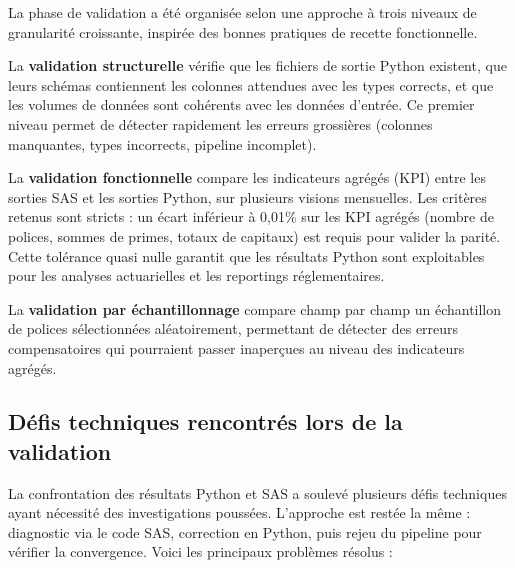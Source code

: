 La phase de validation a été organisée selon une approche à trois niveaux de granularité croissante, inspirée des bonnes pratiques de recette fonctionnelle.

La \textbf{validation structurelle} vérifie que les fichiers de sortie Python existent, que leurs schémas contiennent les colonnes attendues avec les types corrects, et que les volumes de données sont cohérents avec les données d'entrée. Ce premier niveau permet de détecter rapidement les erreurs grossières (colonnes manquantes, types incorrects, pipeline incomplet).

La \textbf{validation fonctionnelle} compare les indicateurs agrégés (KPI) entre les sorties SAS et les sorties Python, sur plusieurs visions mensuelles. Les critères retenus sont stricts : un écart inférieur à 0,01\% sur les KPI agrégés (nombre de polices, sommes de primes, totaux de capitaux) est requis pour valider la parité. Cette tolérance quasi nulle garantit que les résultats Python sont exploitables pour les analyses actuarielles et les reportings réglementaires.

La \textbf{validation par échantillonnage} compare champ par champ un échantillon de polices sélectionnées aléatoirement, permettant de détecter des erreurs compensatoires qui pourraient passer inaperçues au niveau des indicateurs agrégés.

\subsection{Défis techniques rencontrés lors de la validation}

La confrontation des résultats Python et SAS a soulevé plusieurs défis techniques ayant nécessité des investigations poussées. L'approche est restée la même : diagnostic via le code SAS, correction en Python, puis rejeu du pipeline pour vérifier la convergence. Voici les principaux problèmes résolus :

